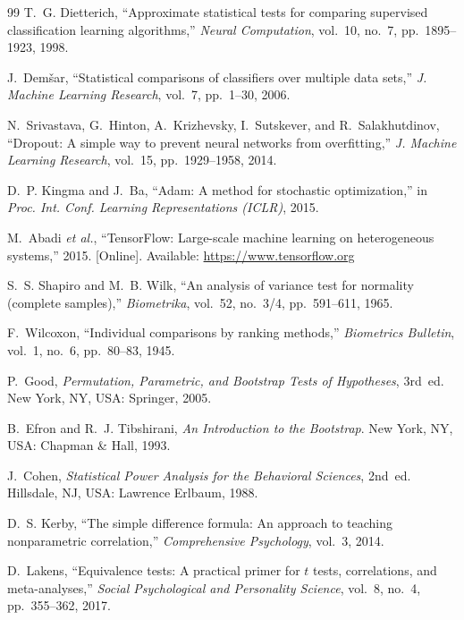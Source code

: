 \documentclass[conference]{IEEEtran}
\begin{document}
\begin{thebibliography}{99}
T.~G. Dietterich, ``Approximate statistical tests for comparing supervised classification learning algorithms,'' \textit{Neural Computation}, vol.~10, no.~7, pp.~1895--1923, 1998.

J.~Demšar, ``Statistical comparisons of classifiers over multiple data sets,'' \textit{J. Machine Learning Research}, vol.~7, pp.~1--30, 2006.

N.~Srivastava, G.~Hinton, A.~Krizhevsky, I.~Sutskever, and R.~Salakhutdinov, ``Dropout: A simple way to prevent neural networks from overfitting,'' \textit{J. Machine Learning Research}, vol.~15, pp.~1929--1958, 2014.

D.~P. Kingma and J.~Ba, ``Adam: A method for stochastic optimization,'' in \textit{Proc. Int. Conf. Learning Representations (ICLR)}, 2015.

M.~Abadi \textit{et al.}, ``TensorFlow: Large-scale machine learning on heterogeneous systems,'' 2015. [Online]. Available: \url{https://www.tensorflow.org}

S.~S. Shapiro and M.~B. Wilk, ``An analysis of variance test for normality (complete samples),'' \textit{Biometrika}, vol.~52, no.~3/4, pp.~591--611, 1965.

F.~Wilcoxon, ``Individual comparisons by ranking methods,'' \textit{Biometrics Bulletin}, vol.~1, no.~6, pp.~80--83, 1945.

P.~Good, \textit{Permutation, Parametric, and Bootstrap Tests of Hypotheses}, 3rd~ed. New York, NY, USA: Springer, 2005.

B.~Efron and R.~J. Tibshirani, \textit{An Introduction to the Bootstrap}. New York, NY, USA: Chapman \& Hall, 1993.

J.~Cohen, \textit{Statistical Power Analysis for the Behavioral Sciences}, 2nd~ed. Hillsdale, NJ, USA: Lawrence Erlbaum, 1988.

D.~S. Kerby, ``The simple difference formula: An approach to teaching nonparametric correlation,'' \textit{Comprehensive Psychology}, vol.~3, 2014.

D.~Lakens, ``Equivalence tests: A practical primer for $t$ tests, correlations, and meta-analyses,'' \textit{Social Psychological and Personality Science}, vol.~8, no.~4, pp.~355--362, 2017.

\end{thebibliography}
\end{document}
